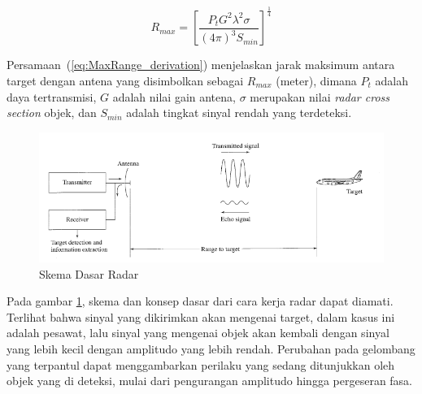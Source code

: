 \begin{equation}
    R_{max} = \left[\frac{P_{t}G^{2}\lambda^{2}\sigma}{(4\pi)^{3}S_{min}}\right]^{\frac{1}{4}}
    \label{eq:MaxRange_derivation}
\end{equation}

Persamaan~(\ref{eq:MaxRange_derivation}) menjelaskan jarak maksimum antara target dengan antena yang disimbolkan sebagai $R_{max}$ (meter), dimana $P_{t}$ adalah daya tertransmisi, $G$ adalah nilai gain antena, $\sigma$ merupakan nilai \textit{radar cross section} objek, dan $S_{min}$ adalah tingkat sinyal rendah yang terdeteksi.

\begin{figure}
	\begin{center}
		\includegraphics[scale=0.3]{pics/bab2/skemaradar.png} 
		\caption[Skema Dasar Radar]{{Skema Dasar Radar} \cite{Skolnik2001}}
		\label{pic:skemaRadar}
	\end{center}
\end{figure}

Pada gambar \ref{pic:skemaRadar}, skema dan konsep dasar dari cara kerja radar dapat diamati. Terlihat bahwa sinyal yang dikirimkan akan mengenai target, dalam kasus ini adalah pesawat, lalu sinyal yang mengenai objek akan kembali dengan sinyal yang lebih kecil dengan amplitudo yang lebih rendah. Perubahan pada gelombang yang terpantul dapat menggambarkan perilaku yang sedang ditunjukkan oleh objek yang di deteksi, mulai dari pengurangan amplitudo hingga pergeseran fasa.

